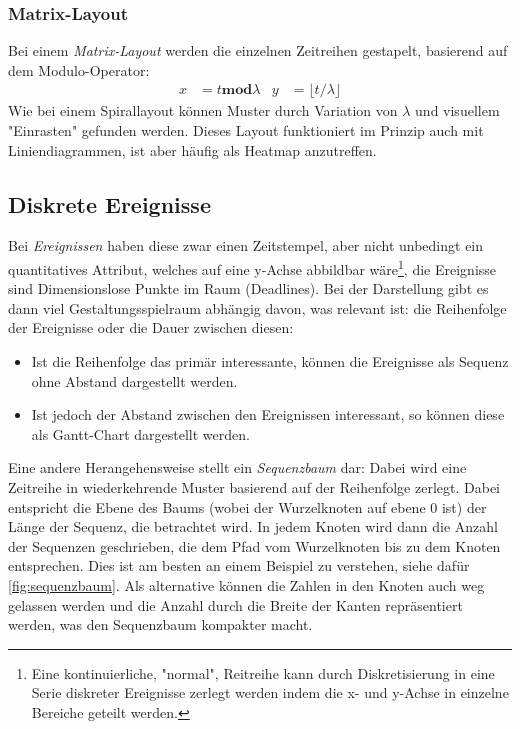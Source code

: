 			\subsubsection{Matrix-Layout}
				Bei einem \emph{Matrix-Layout} werden die einzelnen Zeitreihen gestapelt, basierend auf dem Modulo-Operator:
				\begin{align}
					x &= t \mathbf{ mod } \lambda &
					y &= \lfloor t / \lambda \rfloor
				\end{align}
				Wie bei einem Spirallayout können Muster durch Variation von \(\lambda\) und visuellem "Einrasten" gefunden werden. Dieses Layout funktioniert im Prinzip auch mit Liniendiagrammen, ist aber häufig als Heatmap anzutreffen.

		\subsection{Diskrete Ereignisse}
			Bei \emph{Ereignissen} haben diese zwar einen Zeitstempel, aber nicht unbedingt ein quantitatives Attribut, welches auf eine y-Achse abbildbar wäre\footnote{Eine kontinuierliche, "normal", Reitreihe kann durch Diskretisierung in eine Serie diskreter Ereignisse zerlegt werden indem die x- und y-Achse in einzelne Bereiche geteilt werden.}, \dh die Ereignisse sind Dimensionslose Punkte im Raum (\bspw Deadlines). Bei der Darstellung gibt es dann viel Gestaltungsspielraum abhängig davon, was relevant ist: die Reihenfolge der Ereignisse oder die Dauer zwischen diesen:
			\begin{itemize}
				\item Ist die Reihenfolge das primär interessante, können die Ereignisse als Sequenz ohne Abstand dargestellt werden.
				\item Ist jedoch der Abstand zwischen den Ereignissen interessant, so können diese als Gantt-Chart dargestellt werden.
			\end{itemize}
			Eine andere Herangehensweise stellt ein \emph{Sequenzbaum} dar: Dabei wird eine Zeitreihe in wiederkehrende Muster basierend auf der Reihenfolge zerlegt. Dabei entspricht die Ebene des Baums (wobei der Wurzelknoten auf ebene 0 ist) der Länge der Sequenz, die betrachtet wird. In jedem Knoten wird dann die Anzahl der Sequenzen geschrieben, die dem Pfad vom Wurzelknoten bis zu dem Knoten entsprechen. Dies ist am besten an einem Beispiel zu verstehen, siehe dafür \autoref{fig:sequenzbaum}. Als alternative können die Zahlen in den Knoten auch weg gelassen werden und die Anzahl durch die Breite der Kanten repräsentiert werden, was den Sequenzbaum kompakter macht.

